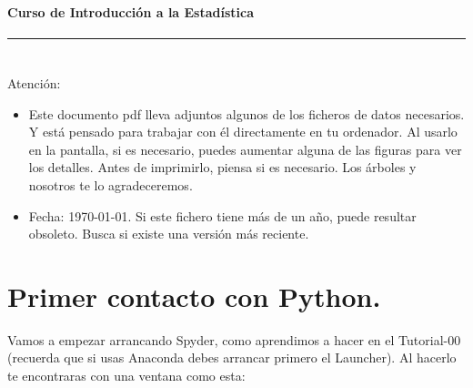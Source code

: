\documentclass[10pt,a4paper]{article}\usepackage[]{graphicx}\usepackage[]{color}
\newcounter {cont01}
\begin{document}

\paragraph{\hspace{6.3cm}Curso de Introducción a la Estadística\\[2mm]} \noindent\hrule

\setcounter{section}{0}
\section*{\hspace{-0.1cm}}

Atención:
{\small
\begin{itemize}
  \item Este documento pdf lleva adjuntos algunos de los ficheros de datos necesarios. Y está pensado para trabajar con él directamente en tu ordenador. Al usarlo en la pantalla, si es necesario, puedes aumentar alguna de las figuras para ver los detalles. Antes de imprimirlo, piensa si es necesario. Los árboles y nosotros te lo agradeceremos.
  \item Fecha: \today. Si este fichero tiene más de un año, puede resultar obsoleto. Busca si existe una versión más reciente.
\end{itemize}


{\small
\setcounter{tocdepth}{1}
\tableofcontents
}
}

\section{Primer contacto con Python.}
\label{tut02:sec:PrimerContactoPython}

Vamos a empezar arrancando Spyder, como aprendimos a hacer en el Tutorial-00 (recuerda que si usas Anaconda debes arrancar primero el Launcher). Al hacerlo te encontraras con una ventana como esta:
\end{document}
